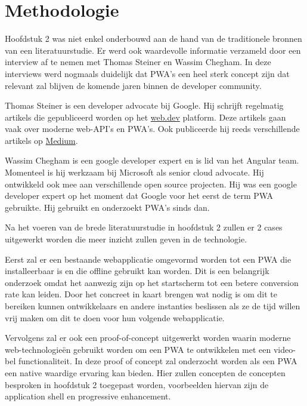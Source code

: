 
\chapter{Methodologie}
\label{ch:methodologie}


Hoofdstuk 2 was niet enkel onderbouwd aan de hand van de traditionele bronnen van een literatuurstudie. 
Er werd ook waardevolle informatie verzameld door een interview af te nemen met Thomas Steiner en Wassim Chegham. In deze interviews werd nogmaals duidelijk dat PWA's een heel sterk concept zijn dat relevant zal blijven de komende jaren binnen de developer community.


Thomas Steiner is een developer advocate bij Google. Hij schrijft regelmatig artikels die gepubliceerd worden op het \href{https://web.dev/authors/thomassteiner/}{web.dev} platform. Deze artikels gaan vaak over moderne web-API's en PWA's. Ook publiceerde hij reeds verschillende artikels op \href{https://medium.com/@tomayac}{Medium}.

Wassim Chegham is een google developer expert en is lid van het Angular team. Momenteel is hij werkzaam bij Microsoft als senior cloud advocate. Hij ontwikkeld ook mee aan verschillende open source projecten. Hij was een google developer expert op het moment dat Google voor het eerst de term PWA gebruikte. Hij gebruikt en onderzoekt PWA's sinds dan.

Na het voeren van de brede literatuurstudie in hoofdstuk 2 zullen er 2 cases uitgewerkt worden die meer inzicht zullen geven in de technologie.

Eerst zal er een bestaande webapplicatie omgevormd worden tot een PWA die installeerbaar is en die offline gebruikt kan worden. Dit is een belangrijk onderzoek omdat het aanwezig zijn op het startscherm tot een betere conversion rate kan leiden. Door het concreet in kaart brengen wat nodig is om dit te bereiken kunnen ontwikkelaars en andere instanties beslissen als ze de tijd willen vrij maken om dit te doen voor hun volgende webapplicatie.

Vervolgens zal er ook een proof-of-concept uitgewerkt worden waarin moderne web-technologieën gebruikt worden om een PWA te ontwikkelen met een video-bel functionaliteit. In deze proof of concept zal onderzocht worden als een PWA een native waardige ervaring kan bieden. Hier zullen concepten de concepten besproken in hoofdstuk 2 toegepast worden, voorbeelden hiervan zijn de application shell en  progressive enhancement.


